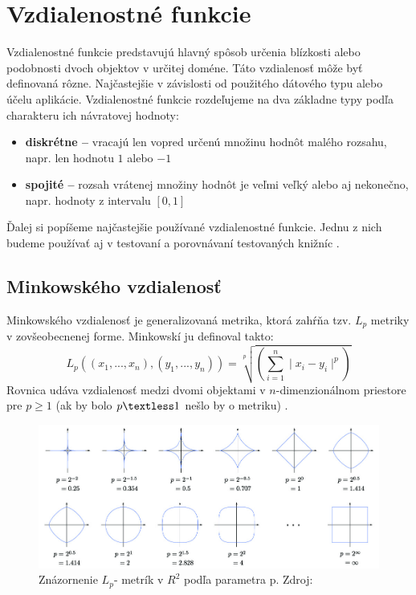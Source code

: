\documentclass[12pt,a4paper,oneside]{fithesis2}
\begin{document}
	\section{Vzdialenostné funkcie}
	
	Vzdialenostné funkcie predstavujú hlavný spôsob určenia blízkosti alebo podobnosti dvoch objektov v určitej doméne. Táto vzdialenosť môže byť definovaná rôzne. Najčastejšie v závislosti od použitého dátového typu alebo účelu aplikácie.
	Vzdialenostné funkcie rozdeľujeme na dva základne typy podľa charakteru ich návratovej hodnoty:
	\begin{itemize}
	\item \textbf{diskrétne --} vracajú len vopred určenú množinu hodnôt malého rozsahu, napr. 	     len hodnotu $1$ alebo $-1$
	\item \textbf{spojité --} rozsah vrátenej množiny hodnôt je veľmi veľký alebo aj nekonečno, 		napr. hodnoty z intervalu $[0,1]$
	\end{itemize}
	Ďalej si popíšeme najčastejšie používané vzdialenostné funkcie. Jednu z nich budeme používať aj v testovaní a porovnávaní testovaných knižníc \cite{Zezula2, Chavez:2001}.
\subsection{Minkowského vzdialenosť}
Minkowského vzdialenosť je generalizovaná metrika, ktorá zahŕňa tzv. $L_p$ metriky v zovšeobecnenej forme. Minkowskí ju definoval takto: 
\begin{equation*}
L_p((x_1,...,x_n),(y_1,...,y_n))=\sqrt[p]{\left(\sum\limits_{i=1}^n \mid x_i-y_i \mid^p \right)}
\end{equation*}
Rovnica udáva vzdialenosť medzi dvomi objektami v $n$-dimenzionálnom priestore pre $p\geq 1$ (ak by bolo $p \textless 1$ nešlo by o metriku) \cite{Zezula2}.  \\
	\begin{figure}
  		\centering
  		\includegraphics[width=\textwidth]{obr/lp.jpg}
  		\caption{Znázornenie $L_p$- metrík v $R^2$ podľa parametra p. Zdroj:\cite{lp}}
	\end{figure}  
\end{document}
